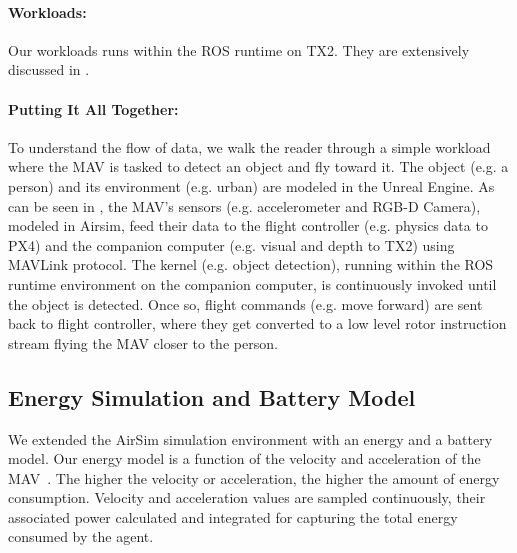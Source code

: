 {\paragraph{Workloads:} Our workloads runs within the ROS runtime on TX2. They are extensively discussed in .

\paragraph{Putting It All Together:} To understand the flow of data, we walk the reader through a simple workload where the MAV is tasked to detect an object and fly toward it. The object (e.g. a person) and its environment (e.g. urban) are modeled in the Unreal Engine. As can be seen in , the MAV's sensors (e.g. accelerometer and \mbox{RGB-D} Camera), modeled in Airsim, feed their data to the flight controller (e.g. physics data to PX4) and the companion computer (e.g. visual and depth to TX2) using MAVLink protocol. The kernel (e.g. object detection), running within the ROS runtime environment on the companion computer, is continuously invoked until the object is detected. Once so, flight commands (e.g. move forward) are sent back to flight controller, where they get converted to a low level rotor instruction stream flying the MAV closer to the person. 

\subsection{Energy Simulation and Battery Model}
\label{sec:energy}

We extended the AirSim simulation environment with an energy and a battery model. Our energy model is a function of the velocity and acceleration of the MAV~\cite{energyaware}. The higher the velocity or acceleration, the higher the amount of energy consumption. Velocity and acceleration values are sampled continuously, their associated power calculated and integrated for capturing the total energy consumed by the agent.

\newcommand{\norm}[1]{\left\lVert#1\right\rVert}

}
